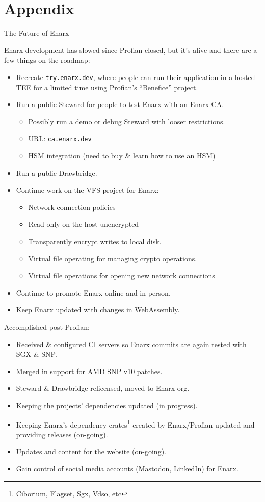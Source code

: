 \documentclass[graphics]{beamer}
\newcommand*\tick{\item[\Checkmark]}
\newcommand{\backupbegin}{
   \newcounter{framenumberappendix}
   \setcounter{framenumberappendix}{\value{framenumber}}
}
\newcommand{\backupend}{
   \addtocounter{framenumberappendix}{-\value{framenumber}}
   \addtocounter{framenumber}{\value{framenumberappendix}} 
}
\begin{document}
\appendix
\backupbegin
\section{Appendix}
\begin{frame}{The Future of Enarx}
     {
        Enarx development has slowed since Profian closed, but it's alive and there are a few things on the roadmap:
        \begin{itemize}
            \item Recreate \texttt{try.enarx.dev}, where people can run their application in a hosted TEE for a limited time using Profian's ``Benefice'' project.
            \item Run a public Steward for people to test Enarx with an Enarx CA.
            \begin{itemize}
                \item Possibly run a demo or debug Steward with looser restrictions.
                \item URL: \texttt{ca.enarx.dev}
                \item HSM integration (need to buy \& learn how to use an HSM)
            \end{itemize}
            \item Run a public Drawbridge.
            \item Continue work on the VFS project for Enarx:
            \begin{itemize}
                \item Network connection policies
                \item Read-only on the host unencrypted
                \item Transparently encrypt writes to local disk.
                \item Virtual file operating for managing crypto operations.
                \item Virtual file operations for opening new network connections
            \end{itemize}
            \item Continue to promote Enarx online and in-person.
            \item Keep Enarx updated with changes in WebAssembly.
        \end{itemize}
    }
     {
        Accomplished post-Profian:
        \begin{itemize}
            \tick Received \& configured CI servers so Enarx commits are again tested with SGX \& SNP.
            \tick Merged in support for AMD SNP v10 patches.
            \tick Steward \& Drawbridge relicensed, moved to Enarx org.
            \tick Keeping the projects' dependencies updated (in progress).
            \tick Keeping Enarx's dependency crates\footnote{Ciborium, Flagset, Sgx, Vdso, etc} created by Enarx/Profian updated and providing releases (on-going).
            \tick Updates and content for the website (on-going).
            \tick Gain control of social media accounts (Mastodon, LinkedIn) for Enarx.
        \end{itemize}
    }
\end{frame}
\backupend
\end{document}
